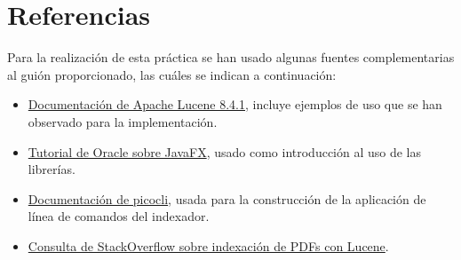 \section{Referencias}

Para la realización de esta práctica se han usado algunas fuentes complementarias al guión proporcionado, las cuáles se indican a continuación:

\begin{itemize}
    \item \href{https://lucene.apache.org/core/8_4_1/index.html}{Documentación de Apache Lucene 8.4.1}, incluye ejemplos de uso que se han observado para la implementación.
    \item \href{https://docs.oracle.com/javafx/2/get_started/jfxpub-get_started.htm}{Tutorial de Oracle sobre JavaFX}, usado como introducción al uso de las librerías.
    \item \href{https://picocli.info/}{Documentación de picocli}, usada para la construcción de la aplicación de línea de comandos del indexador.
    \item \href{https://stackoverflow.com/questions/23762015/how-to-index-pdf-file-with-lucene}{Consulta de StackOverflow sobre indexación de PDFs con Lucene}.
\end{itemize}
